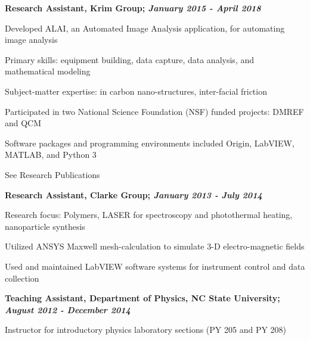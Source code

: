 \documentclass[letterpaper,final]{memoir}
\newcommand{\LargeSep}{\vspace{1.3em}}
\newcommand{\Sep}{\vspace{1.0em}}
\newcommand{\SmallSep}{\vspace{0.4em}}
\newcommand{\CVItem}[1]
	{\textbf{\color{Blue} #1}}
\begin{document}
\Sep

\CVItem{Research Assistant, Krim Group; \textit{January 2015 - April 2018}}
\begin{compactitem}[\color{Blue}$\circ$]

    \SmallSep

    \item Developed ALAI, an Automated Image Analysis application, for automating image analysis
    \item Primary skills: equipment building, data capture, data analysis, and mathematical modeling
    \item Subject-matter expertise: in carbon nano-structures, inter-facial friction
    \item Participated in two National Science Foundation (NSF) funded projects: DMREF and QCM
    \item Software packages and programming environments included Origin, LabVIEW, MATLAB, and Python 3
    \item See Research Publications

\end{compactitem}
\Sep

\CVItem{Research Assistant, Clarke Group; \textit{January 2013 - July 2014}}
\begin{compactitem}[\color{Blue}$\circ$]

    \SmallSep

    \item Research focus: Polymers, LASER for spectroscopy and photothermal heating, nanoparticle synthesis
    \item Utilized ANSYS Maxwell mesh-calculation to simulate 3-D electro-magnetic fields
    \item Used and maintained LabVIEW software systems for instrument control and data collection
\end{compactitem}

\Sep

\CVItem{Teaching Assistant, Department of Physics, NC State University; \textit{August 2012 - December 2014}}
\begin{compactitem}[\color{Blue}$\circ$]

    \SmallSep

    \item Instructor for introductory physics laboratory sections (PY 205 and PY 208)
\end{compactitem}

\LargeSep

\newpage
\end{document}
